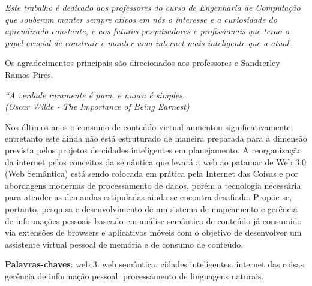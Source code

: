 \documentclass[
	12pt,				%
	openright,			%
	twoside,			%
	a4paper,			%
	english,			%
	french,				%
	spanish,			%
	brazil				%
	]{abntex2}
\begin{document}
\begin{dedicatoria}
   \vspace*{\fill}
   \centering
   \noindent
   \textit{ Este trabalho é dedicado aos professores do curso de Engenharia de Computação que souberam manter sempre ativos em nós o interesse e a curiosidade do aprendizado constante, e aos futuros pesquisadores e profissionais que terão o papel crucial de construir e manter uma internet mais inteligente que a atual. } \vspace*{\fill}
\end{dedicatoria}

\begin{agradecimentos}
Os agradecimentos principais são direcionados aos professores  {\imprimirorientador} e Sandrerley Ramos Pires.

\end{agradecimentos}

\begin{epigrafe}
    \vspace*{\fill}
	\begin{flushright}
		\textit{``A verdade raramente é pura, e nunca é simples. \\
		(Oscar Wilde - The Importance of Being Earnest)}
	\end{flushright}
\end{epigrafe}


\setlength{\absparsep}{18pt} %
\begin{resumo}
 Nos últimos anos o consumo de conteúdo virtual aumentou significativamente, entretanto este ainda não está estruturado de maneira preparada para a dimensão prevista pelos projetos de cidades inteligentes em planejamento. A reorganização da internet pelos conceitos da semântica que levará a web ao patamar de Web 3.0 (Web Semântica) está sendo colocada em prática pela Internet das Coisas e por abordagens modernas de processamento de dados, porém a tecnologia necessária para atender as demandas estipuladas ainda se encontra desafiada. Propõe-se, portanto, pesquisa e desenvolvimento de um sistema de mapeamento e gerência de informações pessoais baseado em análise semântica de conteúdo já consumido via extensões de browsers e aplicativos móveis com o objetivo de desenvolver um assistente virtual pessoal de memória e de consumo de conteúdo.

 \textbf{Palavras-chaves}: web 3. web semântica. cidades inteligentes. internet das coisas. gerência de informação pessoal. processamento de linguagens naturais.
\end{resumo}
\end{document}

